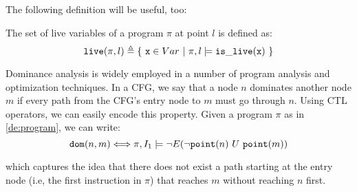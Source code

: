 The following definition will be useful, too:

\begin{definition}
\label{de:live-var}
The set of live variables of a program $\pi$ at point $l$ is defined as:
\vspace{-1mm}
\begin{equation*}
\text{${\tt live}$}(\pi,l) \triangleq \{ ~ \text{${\tt x}$}\in Var ~ | ~ \pi, l\models \text{${\tt is\_live}$}(\text{${\tt x}$}) ~ \}
\end{equation*}
\end{definition}




\begin{example}
Dominance analysis is widely employed in a number of program analysis and optimization techniques. In a CFG, we say that a node $n$ dominates another node $m$ if every path from the CFG's entry node to $m$ must go through $n$. Using CTL operators, we can easily encode this property. Given a program $\pi$ as in \mydefinition\ref{de:program}, we can write:
\begin{equation*}
 \text{${\tt dom}$}(n,m) \Longleftrightarrow \pi,I_1 \models \neg E(\neg\text{${\tt point}$}(n)~U~\text{${\tt point}$}(m))
\end{equation*}

\noindent which captures the idea that there does not exist a path starting at the entry node (i.e, the first instruction in $\pi$) that reaches $m$ without reaching $n$ first.
\end{example}

